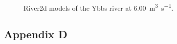\begin{figure}[h!]
\begin{tabular}{ l  c }
	\end{tabular}
	\label{fig:0600}
	
	\caption{River2d models of the Ybbs river at \SI[per-mode=symbol]{6.00}{\cubic\meter\per\second}.}   %
	
\end{figure}


\newpage                                                                %


\subsection*{Appendix D}\label{appendixD}                        %

\renewcommand\thefigure{A.\arabic{figure}}                          %
\setcounter{figure}{0}                                              %

